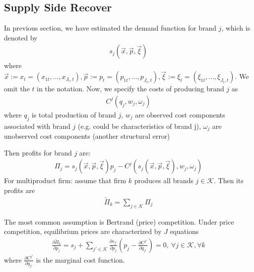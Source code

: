 \documentclass[11pt]{elegantbook}
\begin{document}
\subsection{Supply Side Recover}
In previous section, we have estimated the demand function for brand $j$, which is denoted by
\begin{equation}
    \begin{aligned}
        s_j\left(\vec{x},\vec{p},\vec{\xi}\right)
    \end{aligned}
    \nonumber
\end{equation}
where $\vec{x}:=x_t=(x_{1t},...,x_{J_t,t}), \vec{p}:=p_t=(p_{1t},...,p_{J_t,t}), \vec{\xi}:=\xi_t=(\xi_{1t},..., \xi_{J_t,t})$. We omit the $t$ in the notation. Now, we specify the costs of producing brand $j$ as
\begin{equation}
    \begin{aligned}
        C^j\left(q_j,w_j,\omega_j\right)
    \end{aligned}
    \nonumber
\end{equation}
where $q_j$ is total production of brand $j$, $w_j$ are observed cost components associated with brand $j$ (e.g. could be characteristics of brand j), $\omega_j$ are unobserved cost components (another structural error)

Then profits for brand $j$ are:
\begin{equation}
    \begin{aligned}
        \Pi_j=s_j\left(\vec{x},\vec{p},\vec{\xi}\right)p_j-C^j\left(s_j\left(\vec{x},\vec{p},\vec{\xi}\right),w_j,\omega_j\right)
    \end{aligned}
    \nonumber
\end{equation}
For multiproduct firm: assume that firm $k$ produces all brands $j \in \mathcal{K}$. Then its profits are
\begin{equation}
    \begin{aligned}
        \tilde{\Pi}_k=\sum_{j \in \mathcal{K}}\Pi_j
    \end{aligned}
    \nonumber
\end{equation}

The most common assumption is Bertrand (price) competition. Under price competition, equilibrium prices are characterized by $J$ equations
\begin{equation}
    \begin{aligned}
        \frac{\partial \tilde{\Pi}_k}{\partial p_j}=s_j+\sum_{j'\in \mathcal{K}}\frac{\partial s_{j'}}{\partial p_j}\left(p_j-\frac{\partial C^{j'}}{\partial q_{j'}}\right)=0,\ \forall j\in \mathcal{K},\forall k
    \end{aligned}
    \nonumber
\end{equation}
where $\frac{\partial C^{j'}}{\partial q_{j'}}$ is the marginal cost function.
\end{document}
